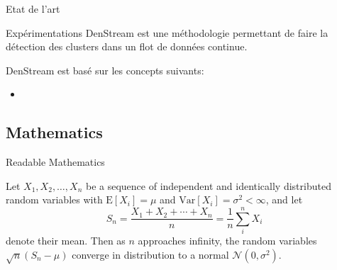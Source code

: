 \documentclass{beamer}
\begin{document}
\begin{frame}{Etat de l'art}
	
	
	
\begin{table}[ht]
	\centering
	\caption{Etude comparative des différentes méthodes de clustering en ligne incrémentale existante dans l'état de l'art} 
\end{table} 
	
	
\end{frame}

\begin{frame}{Expérimentations}
	DenStream est une méthodologie permettant de faire la détection des clusters dans un flot de données continue.
	
	DenStream est basé sur les concepts suivants:
	\begin{itemize}
		\item 
	\end{itemize}
	
	
\end{frame}

\subsection{Mathematics}

\begin{frame}{Readable Mathematics}

Let $X_1, X_2, \ldots, X_n$ be a sequence of independent and identically distributed random variables with $\text{E}[X_i] = \mu$ and $\text{Var}[X_i] = \sigma^2 < \infty$, and let
$$S_n = \frac{X_1 + X_2 + \cdots + X_n}{n}
      = \frac{1}{n}\sum_{i}^{n} X_i$$
denote their mean. Then as $n$ approaches infinity, the random variables $\sqrt{n}(S_n - \mu)$ converge in distribution to a normal $\mathcal{N}(0, \sigma^2)$.

\end{frame}
\end{document}

